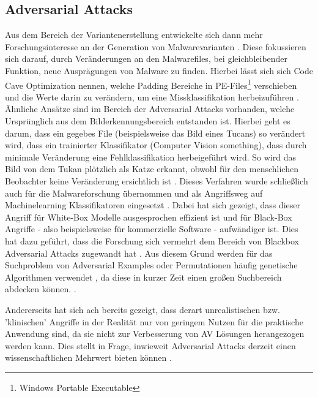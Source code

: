 \subsection{Adversarial Attacks}
Aus dem Bereich der Variantenerstellung entwickelte sich dann mehr Forschungsinteresse an der Generation von Malwarevarianten \cite{jin_2023_on}. Diese fokussieren sich darauf, durch Veränderungen an den Malwarefiles, bei gleichbleibender Funktion, neue Ausprägungen von Malware zu finden. Hierbei lässt sich sich Code Cave Optimization nennen, welche Padding Bereiche in PE-Files\footnote{Windows Portable Executable} verschieben und die Werte darin zu verändern, um eine Missklassifikation herbeizuführen \cite{yuste_2022_optimization}. Ähnliche Ansätze sind im Bereich der Adversarial Attacks vorhanden, welche Ursprünglich aus dem Bilderkennungsbereich entstanden ist. Hierbei geht es darum, dass ein gegebes File (beispielsweise das Bild eines Tucans) so verändert wird, dass ein trainierter Klassifikator (Computer Vision something), dass durch minimale Veränderung eine Fehlklassifikation herbeigeführt wird. So wird das Bild von dem Tukan plötzlich als Katze erkannt, obwohl für den menschlichen Beobachter keine Veränderung ersichtlich ist \cite{demetrio_2024_formalizing}. Dieses Verfahren wurde schließlich auch für die Malwareforschung übernommen und als Angriffsweg auf Machinelearning Klassifikatoren eingesetzt \cite{demetrio_2021_functionalitypreserving}. Dabei hat sich gezeigt, dass dieser Angriff für White-Box Modelle ausgesprochen effizient ist und für Black-Box Angriffe - also beispielsweise für kommerzielle Software - aufwändiger ist. 
Dies hat dazu geführt, dass die Forschung sich vermehrt dem Bereich 
 von Blackbox Adversarial Attacks zugewandt hat \cite{yuste_2022_optimization}.
Aus diesem Grund werden für das Suchproblem von Adversarial Examples oder Permutationen häufig genetische Algorithmen verwendet \cite{demetrio_2021_functionalitypreserving}, da diese in kurzer Zeit einen großen Suchbereich abdecken können. \label{adversarial_example}.

Andererseits hat sich ach bereits gezeigt, dass derart unrealistischen bzw. 'klinischen' Angriffe in der Realität nur von geringem Nutzen für die praktische Anwendung sind, da sie nicht zur Verbesserung von AV Lösungen herangezogen werden kann. Dies stellt in Frage, inwieweit Adversarial Attacks derzeit einen wissenschaftlichen Mehrwert bieten können \cite{dyrmishi_2023_on}.